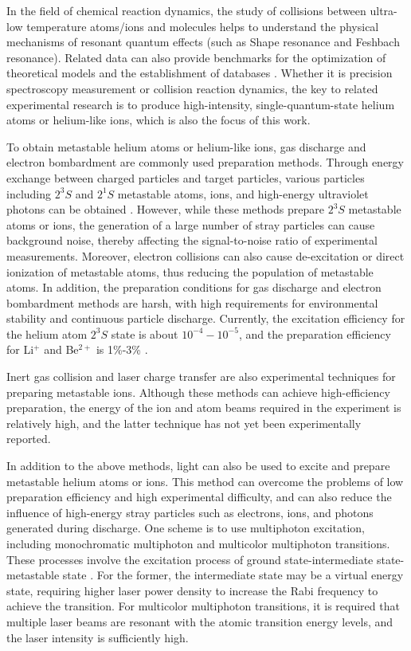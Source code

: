 \documentclass[12pt,a4paper]{article}
\begin{document}
In the field of chemical reaction dynamics, the study of collisions between ultra-low temperature atoms/ions and molecules helps to understand the physical mechanisms of resonant quantum effects (such as Shape resonance and Feshbach resonance). Related data can also provide benchmarks for the optimization of theoretical models and the establishment of databases \cite{ref22,ref23,ref25,ref36}. Whether it is precision spectroscopy measurement or collision reaction dynamics, the key to related experimental research is to produce high-intensity, single-quantum-state helium atoms or helium-like ions, which is also the focus of this work.

To obtain metastable helium atoms or helium-like ions, gas discharge and electron bombardment are commonly used preparation methods. Through energy exchange between charged particles and target particles, various particles including $2^3S$ and $2^1S$ metastable atoms, ions, and high-energy ultraviolet photons can be obtained \cite{ref37,ref38}. However, while these methods prepare $2^3S$ metastable atoms or ions, the generation of a large number of stray particles can cause background noise, thereby affecting the signal-to-noise ratio of experimental measurements. Moreover, electron collisions can also cause de-excitation or direct ionization of metastable atoms, thus reducing the population of metastable atoms. In addition, the preparation conditions for gas discharge and electron bombardment methods are harsh, with high requirements for environmental stability and continuous particle discharge. Currently, the excitation efficiency for the helium atom $2^3S$ state is about $10^{-4} - 10^{-5}$, and the preparation efficiency for Li$^{+}$ and Be$^{2+}$ is 1\%-3\% \cite{ref39,ref40}.

Inert gas collision and laser charge transfer are also experimental techniques for preparing metastable ions. Although these methods can achieve high-efficiency preparation, the energy of the ion and atom beams required in the experiment is relatively high, and the latter technique has not yet been experimentally reported.

In addition to the above methods, light can also be used to excite and prepare metastable helium atoms or ions. This method can overcome the problems of low preparation efficiency and high experimental difficulty, and can also reduce the influence of high-energy stray particles such as electrons, ions, and photons generated during discharge. One scheme is to use multiphoton excitation, including monochromatic multiphoton and multicolor multiphoton transitions. These processes involve the excitation process of ground state-intermediate state-metastable state \cite{ref41,ref42}. For the former, the intermediate state may be a virtual energy state, requiring higher laser power density to increase the Rabi frequency to achieve the transition. For multicolor multiphoton transitions, it is required that multiple laser beams are resonant with the atomic transition energy levels, and the laser intensity is sufficiently high.
\end{document}
